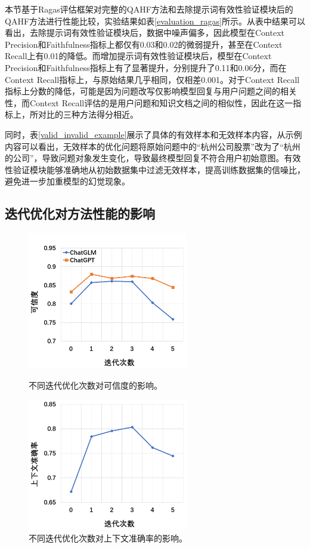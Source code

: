 本节基于Ragas评估框架对完整的QAHF方法和去除提示词有效性验证模块后的QAHF方法进行性能比较，实验结果如表\ref{evaluation_ragas}所示。从表中结果可以看出，去除提示词有效性验证模块后，数据中噪声偏多，因此模型在Context Precision和Faithfulness指标上都仅有0.03和0.02的微弱提升，甚至在Context Recall上有0.01的降低。而增加提示词有效性验证模块后，模型在Context Precision和Faithfulness指标上有了显著提升，分别提升了0.11和0.06分，而在Context Recall指标上，与原始结果几乎相同，仅相差0.001。对于Context Recall指标上分数的降低，可能是因为问题改写仅影响模型回复与用户问题之间的相关性，而Context Recall评估的是用户问题和知识文档之间的相似性，因此在这一指标上，所对比的三种方法得分相近。

同时，表\ref{valid_invalid_example}展示了具体的有效样本和无效样本内容，从示例内容可以看出，无效样本的优化问题将原始问题中的“杭州公司股票”改为了“杭州的公司”，导致问题对象发生变化，导致最终模型回复不符合用户初始意图。有效性验证模块能够准确地从初始数据集中过滤无效样本，提高训练数据集的信噪比，避免进一步加重模型的幻觉现象。

\subsection{迭代优化对方法性能的影响}

\begin{figure}[htbp]
	\centering
	\begin{minipage}[t]{0.49\textwidth}
		\centering
		\includegraphics[width=7cm]{Fig/multi_iter_optimize_ragas_faithfulness.png}
		\caption{\label{multi_iter_optimize_ragas_faithfulness}不同迭代优化次数对可信度的影响。}
	\end{minipage}
	\begin{minipage}[t]{0.49\textwidth}
		\centering
		\includegraphics[width=7cm]{Fig/multi_iter_optimize_ragas_precision.png}
		\caption{\label{multi_iter_optimize_ragas_precision}不同迭代优化次数对上下文准确率的影响。}
	\end{minipage}
\end{figure}

